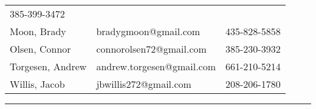 \begin{longtable}[]{@{}lll@{}}
\begin{minipage}[t]{0.30\columnwidth}
{385-399-3472}\strut
\end{minipage}\tabularnewline
\begin{minipage}[t]{0.30\columnwidth}\raggedright\strut
{Moon, Brady}\strut
\end{minipage} & \begin{minipage}[t]{0.30\columnwidth}\raggedright\strut
{bradygmoon@gmail.com}\strut
\end{minipage} & \begin{minipage}[t]{0.30\columnwidth}\raggedright\strut
{435-828-5858}\strut
\end{minipage}\tabularnewline
\begin{minipage}[t]{0.30\columnwidth}\raggedright\strut
{Olsen, Connor}\strut
\end{minipage} & \begin{minipage}[t]{0.30\columnwidth}\raggedright\strut
{connorolsen72@gmail.com}\strut
\end{minipage} & \begin{minipage}[t]{0.30\columnwidth}\raggedright\strut
{385-230-3932}\strut
\end{minipage}\tabularnewline
\begin{minipage}[t]{0.30\columnwidth}\raggedright\strut
{Torgesen, Andrew}\strut
\end{minipage} & \begin{minipage}[t]{0.30\columnwidth}\raggedright\strut
{andrew.torgesen@gmail.com}\strut
\end{minipage} & \begin{minipage}[t]{0.30\columnwidth}\raggedright\strut
{661-210-5214}\strut
\end{minipage}\tabularnewline
\begin{minipage}[t]{0.30\columnwidth}\raggedright\strut
{Willis, Jacob}\strut
\end{minipage} & \begin{minipage}[t]{0.30\columnwidth}\raggedright\strut
{jbwillis272@gmail.com}\strut
\end{minipage} & \begin{minipage}[t]{0.30\columnwidth}\raggedright\strut
{208-206-1780}\strut
\end{minipage}\tabularnewline
\bottomrule
\end{longtable}

{}

\begin{center}\rule{0.5\linewidth}{\linethickness}\end{center}

